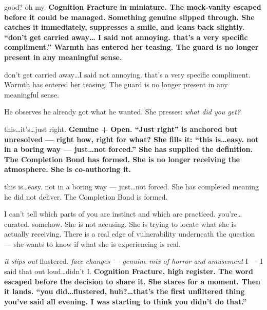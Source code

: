 \thinrule

{good? oh my.}
{\textbf{Cognition Fracture in miniature. The mock-vanity escaped before it 
could be managed. Something genuine slipped through. She catches it immediately, 
suppresses a smile, and leans back slightly. ``don't get carried away\ldots 
I said not annoying. that's a very specific compliment.'' Warmth has entered 
her teasing. The guard is no longer present in any meaningful sense.}}

{don't get carried away\ldots I said not annoying. that's a very specific 
compliment.}
{Warmth has entered her teasing. The guard is no longer present in any 
meaningful sense.}

\thinrule

{He observes he already got what he wanted. She presses: \textit{what did 
you get?}}

{this\ldots it's\ldots just right.}
{\textbf{Genuine + Open. ``Just right'' is anchored but unresolved --- right 
how, right for what? She fills it: ``this is\ldots easy. not in a boring way 
--- just\ldots not forced.'' She has supplied the definition. The Completion 
Bond has formed. She is no longer receiving the atmosphere. She is 
co-authoring it.}}

{this is\ldots easy. not in a boring way --- just\ldots not forced.}
{She has completed meaning he did not deliver. The Completion Bond is formed.}

\thinrule

{I can't tell which parts of you are instinct and which are practiced. 
you're\ldots curated. somehow.}
{She is not accusing. She is trying to locate what she is actually receiving. 
There is a real edge of vulnerability underneath the question --- she wants 
to know if what she is experiencing is real.}

{\textit{it slips out} flustered. \textit{face changes --- genuine mix of 
horror and amusement} I --- I said that out loud\ldots didn't I.}
{\textbf{Cognition Fracture, high register. The word escaped before the 
decision to share it. She stares for a moment. Then it lands. 
``you did\ldots flustered, huh?\ldots that's the first unfiltered thing 
you've said all evening. I was starting to think you didn't do that.''}}

